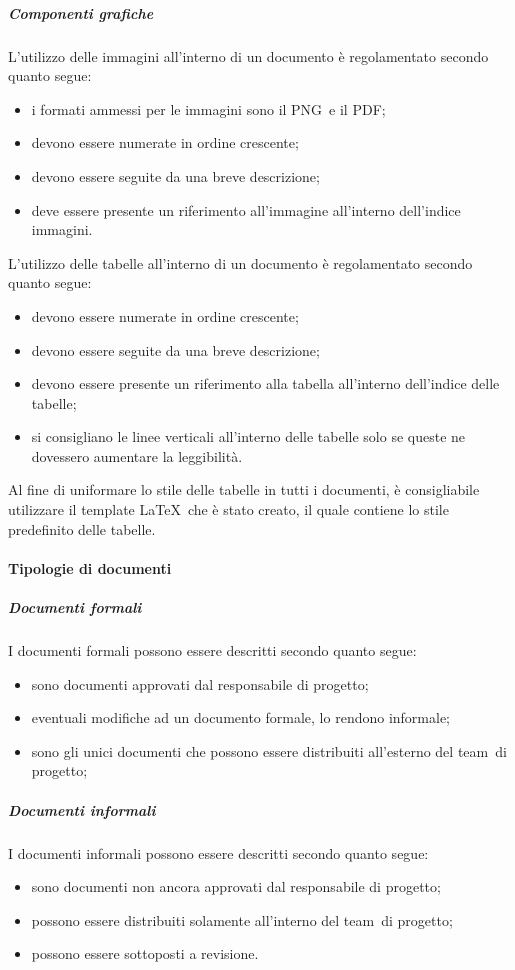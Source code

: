 \documentclass[../NormeProgetto.tex]{subfiles}
\begin{document}
		\subparagraph{Componenti grafiche}
			L'utilizzo delle immagini all'interno di un documento è regolamentato secondo quanto segue:
			\begin{itemize}
				\item i formati ammessi per le immagini sono il PNG\g\ e il PDF\g;
				\item devono essere numerate in ordine crescente;
				\item devono essere seguite da una breve descrizione;
				\item deve essere presente un riferimento all'immagine all'interno dell'indice immagini.
			\end{itemize}
			\subsubparagraph{Tabelle}
			L'utilizzo delle tabelle all'interno di un documento è regolamentato secondo quanto segue:
			\begin{itemize}
				\item devono essere numerate in ordine crescente;
				\item devono essere seguite da una breve descrizione;
				\item devono essere presente un riferimento alla tabella all'interno dell'indice delle tabelle;
				\item si consigliano le linee verticali all'interno delle tabelle solo se queste ne dovessero aumentare la leggibilità.
			\end{itemize}
			
			Al fine di uniformare lo stile delle tabelle in tutti i documenti, è consigliabile utilizzare il template \LaTeX\ che è stato creato, il quale contiene lo stile predefinito delle tabelle.
	
			
	\paragraph{Tipologie di documenti}
		\subparagraph{Documenti formali}
		I documenti formali possono essere descritti secondo quanto segue:
		\begin{itemize}
			\item sono documenti approvati dal responsabile di progetto;
			\item eventuali modifiche ad un documento formale, lo rendono informale;
			\item sono gli unici documenti che possono essere distribuiti all'esterno del team\g\ di progetto;
		\end{itemize}
		
		\subparagraph{Documenti informali}
		I documenti informali possono essere descritti secondo quanto segue:
		\begin{itemize}
			\item sono documenti non ancora approvati dal responsabile di progetto;
			\item possono essere distribuiti solamente all'interno del team\g\ di progetto;
			\item possono essere sottoposti a revisione.
		\end{itemize}
		
\end{document}
